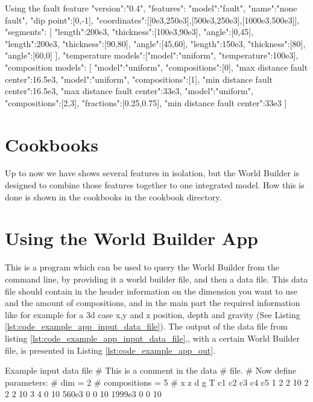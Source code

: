 \documentclass{book}
\newcommand{\WB}{{World Builder}}
\begin{document}
\begin{javascriptcode}{Using the fault feature}{}
"version":"0.4",
"features":
{
  {
    "model":"fault", "name":"none fault",  "dip point":[0,-1],
    "coordinates":[[0e3,250e3],[500e3,250e3],[1000e3,500e3]],
    "segments":
    [
      {"length":200e3, "thickness":[100e3,90e3], "angle":[0,45]}, 
      {"length":200e3, "thickness":[90,80], "angle":[45,60]}, 
      {"length":150e3, "thickness":[80], "angle":[60,0]}
    ],
    "temperature models":[{"model":"uniform", "temperature":100e3}],
    "composition models":
    [
      {"model":"uniform", "compositions":[0], "max distance fault center":16.5e3},
      {"model":"uniform", "compositions":[1], "min distance fault center":16.5e3, 
        "max distance fault center":33e3},
      {"model":"uniform", "compositions":[2,3], "fractions":[0.25,0.75], 
         "min distance fault center":33e3}
    ]
  }
}
\end{javascriptcode}

\section{Cookbooks}
Up to now we have shows several features in isolation, but the \WB{} is designed to combine those features together to one integrated model. How this is done is shown in the cookbooks in the cookbook directory.

\section{Using the World Builder App}
\label{section:using_the_app}
This is a program which can be used to query the \WB{} from the command line, by providing it a world builder file, and then a data file. This data file should contain in the header information on the dimension you want to use and the amount of compositions, and in the main part the required information like for example for a 3d case x,y and z position, depth and gravity (See Listing \ref{lst:code_example_app_input_data_file}). The output of the data file from listing \ref{lst:code_example_app_input_data_file},, with a certain \WB{} file, is presented in Listing \ref{lst:code_example_app_out}.

\begin{bashcode}[label={lst:code_example_app_input_data_file}]{Example input data file}
# This is a comment in the data
# file. 
# Now define parameters:
# dim = 2
# compositions = 5
# x      z d g  T c1 c2 c3 c4 c5
  1      2 2 10
  2      2 2 10
  3      4 0 10
  560e3  0 0 10
  1999e3 0 0 10
\end{bashcode}
\end{document}

